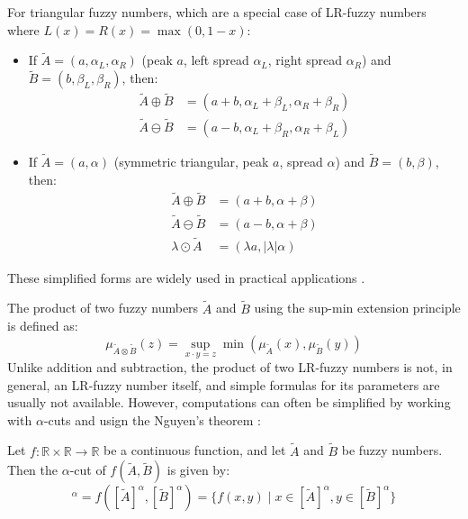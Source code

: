 \begin{remark}
For triangular fuzzy numbers, which are a special case of LR-fuzzy numbers where $L(x)=R(x)=\max(0, 1-x)$:
\begin{itemize}
    \item If $\tilde{A} = (a, \alpha_L, \alpha_R)$ (peak $a$, left spread $\alpha_L$, right spread $\alpha_R$) and $\tilde{B} = (b, \beta_L, \beta_R)$, then:
    \begin{align*}
    \tilde{A} \oplus \tilde{B} &= (a+b, \alpha_L+\beta_L, \alpha_R+\beta_R) \\
    \tilde{A} \ominus \tilde{B} &= (a-b, \alpha_L+\beta_R, \alpha_R+\beta_L)
    \end{align*}
    \item If $\tilde{A} = (a, \alpha)$ (symmetric triangular, peak $a$, spread $\alpha$) and $\tilde{B} = (b, \beta)$, then:
    \begin{align*}
    \tilde{A} \oplus \tilde{B} &= (a+b, \alpha+\beta) \\
    \tilde{A} \ominus \tilde{B} &= (a-b, \alpha+\beta) \\
    \lambda \odot \tilde{A} &= (\lambda a, |\lambda|\alpha)
    \end{align*}
\end{itemize}
These simplified forms are widely used in practical applications \cite[p.17]{FULLER2}.
\end{remark}



The product of two fuzzy numbers $\tilde{A}$ and $\tilde{B}$ using the sup-min extension principle is defined as:
\begin{equation}
\mu_{\tilde{A} \otimes \tilde{B}}(z) = \sup_{x \cdot y = z} \min(\mu_{\tilde{A}}(x), \mu_{\tilde{B}}(y))
\end{equation}
Unlike addition and subtraction, the product of two LR-fuzzy numbers is not, in general, an LR-fuzzy number itself, and simple formulas for its parameters are usually not available.
However, computations can often be simplified by working with $\alpha$-cuts and usign the Nguyen's theorem \cite[Thm. 1.3.2]{FULLER2}:

\begin{theorem}
\label{thm:alpha_cut_product}
Let $f: \mathbb{R} \times \mathbb{R} \to \mathbb{R}$ be a continuous function, and let $\tilde{A}$ and $\tilde{B}$ be fuzzy numbers. Then the $\alpha$-cut of $f(\tilde{A}, \tilde{B})$ is given by:
\begin{equation}
[f(\tilde{A}, \tilde{B})]^\alpha = f([\tilde{A}]^\alpha, [\tilde{B}]^\alpha) = \{f(x,y) \mid x \in [\tilde{A}]^\alpha, y \in [\tilde{B}]^\alpha \}
\end{equation}
\end{theorem}


